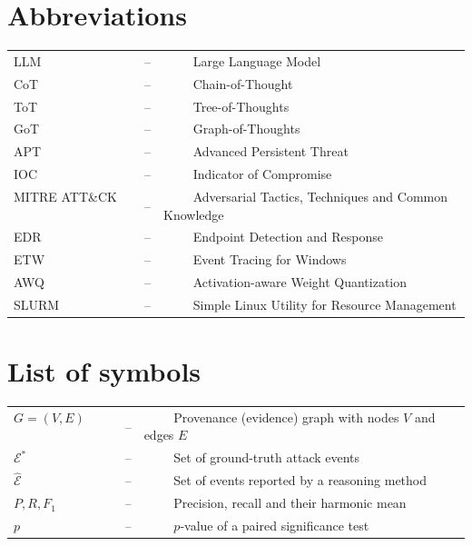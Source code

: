 \documentclass[a4paper, 12pt]{report}
\theoremstyle{definition}
\begin{document}
\section*{{\huge Abbreviations}\hfill} 
\vspace{1.2cm}
\begin{tabular}{lll}
LLM ~~~~&--&~~~~ Large Language Model	\\
CoT ~~~~&--&~~~~ Chain-of-Thought\\
ToT ~~~~&--&~~~~ Tree-of-Thoughts\\
GoT ~~~~&--&~~~~ Graph-of-Thoughts\\
APT ~~~~&--&~~~~ Advanced Persistent Threat\\
IOC ~~~~&--&~~~~ Indicator of Compromise\\
MITRE ATT\&CK ~~~~&--&~~~~ Adversarial Tactics, Techniques and Common Knowledge\\
EDR ~~~~&--&~~~~ Endpoint Detection and Response\\
ETW ~~~~&--&~~~~ Event Tracing for Windows\\
AWQ ~~~~&--&~~~~ Activation-aware Weight Quantization\\
SLURM ~~~~&--&~~~~ Simple Linux Utility for Resource Management\\
\end{tabular}
\newpage
\section*{{\huge List of symbols}\hfill} 
\vspace{1.2cm}
\begin{tabular}{lll}
$ G=(V,E) $ ~~~~&--&~~~~ Provenance (evidence) graph with nodes $V$ and edges $E$\\
$ \mathcal{E}^{*} $ ~~~~&--&~~~~ Set of ground-truth attack events\\
$ \hat{\mathcal{E}} $ ~~~~&--&~~~~ Set of events reported by a reasoning method\\
$ P, R, F_1 $ ~~~~&--&~~~~ Precision, recall and their harmonic mean\\
$ p $ ~~~~&--&~~~~ $p$-value of a paired significance test\\
\end{tabular}
\end{document}

